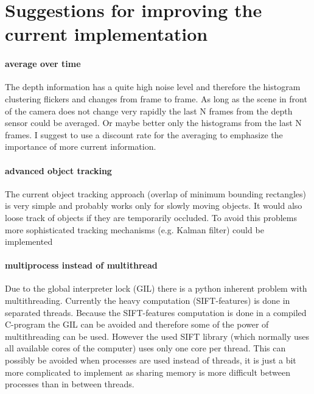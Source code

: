 \section{Suggestions for improving the current implementation} %
\label{sg:sec:suggestions_for_improving_the_current_implementation}
\paragraph{average over time} %
\label{par:average_over_time}
The depth information has a quite high noise level and therefore the histogram clustering flickers and changes from frame to frame. As long as the scene in front of the camera does not change very rapidly the last N frames from the depth sensor could be averaged. Or maybe better only the histograms from the last N frames. I suggest to use a discount rate for the averaging to emphasize the importance of more current information.

\paragraph{advanced object tracking} %
\label{par:advanced_object_tracking}
The current object tracking approach (overlap of minimum bounding rectangles) is very simple and probably works only for slowly moving objects. It would also loose track of objects if they are temporarily occluded. To avoid this problems more sophisticated tracking mechanisms (e.g. Kalman filter) could be implemented

\paragraph{multiprocess instead of multithread} %
\label{par:multiprocess_instead_of_multithread}
Due to the global interpreter lock (GIL) there is a python inherent problem with multithreading. Currently the heavy computation (SIFT-features) is done in separated threads. Because the SIFT-features computation is done in a compiled C-program the GIL can be avoided and therefore some of the power of multithreading can be used. However the used SIFT library (which normally uses all available cores of the computer) uses only one core per thread. This can possibly be avoided when processes are used instead of threads, it is just a bit more complicated to implement as sharing memory is more difficult between processes than in between threads.

